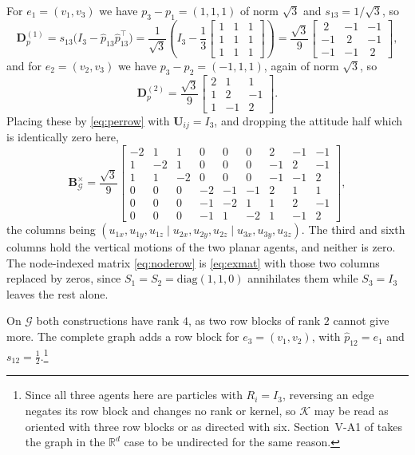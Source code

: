 \documentclass[11pt,a4paper]{article}
\theoremstyle{plain}
\theoremstyle{definition}
\newcommand{\R}{\mathbb{R}}
\newcommand{\Bper}{\mathbf{B}^{\times}}
\newcommand{\Dp}{\mathbf{D}_p}
\begin{document}
For $e_1=(v_1,v_3)$ we have $p_3-p_1=(1,1,1)$ of norm $\sqrt3$ and
$s_{13}=1/\sqrt3$, so
\begin{equation*}
  \Dp^{(1)}=s_{13}\bigl(I_3-\hat p_{13}\hat p_{13}^\top\bigr)
  =\frac{1}{\sqrt3}\left(I_3-\frac13
  \begin{bmatrix}1&1&1\\1&1&1\\1&1&1\end{bmatrix}\right)
  =\frac{\sqrt3}{9}
  \begin{bmatrix}\ 2&-1&-1\\-1&\ 2&-1\\-1&-1&\ 2\end{bmatrix},
\end{equation*}
and for $e_2=(v_2,v_3)$ we have $p_3-p_2=(-1,1,1)$, again of norm $\sqrt3$, so
\begin{equation*}
  \Dp^{(2)}
  =\frac{\sqrt3}{9}
  \begin{bmatrix}2&1&1\\1&2&-1\\1&-1&2\end{bmatrix}.
\end{equation*}
Placing these by \eqref{eq:perrow} with $\mathbf U_{ij}=I_3$, and dropping the
attitude half which is identically zero here,
\begin{equation}\label{eq:exmat}
  \Bper_{\mathcal G}
  =\frac{\sqrt3}{9}
  \left[\begin{array}{rrr|rrr|rrr}
    -2& 1& 1& 0& 0& 0&  2&-1&-1\\
     1&-2& 1& 0& 0& 0& -1& 2&-1\\
     1& 1&-2& 0& 0& 0& -1&-1& 2\\\hline
     0& 0& 0&-2&-1&-1&  2& 1& 1\\
     0& 0& 0&-1&-2& 1&  1& 2&-1\\
     0& 0& 0&-1& 1&-2&  1&-1& 2
  \end{array}\right],
\end{equation}
the columns being $(u_{1x},u_{1y},u_{1z}\mid u_{2x},u_{2y},u_{2z}\mid
u_{3x},u_{3y},u_{3z})$. The third and sixth columns hold the vertical motions
of the two planar agents, and neither is zero. The node-indexed matrix
\eqref{eq:noderow} is \eqref{eq:exmat} with those two columns replaced by
zeros, since $S_1=S_2=\mathrm{diag}(1,1,0)$ annihilates them while $S_3=I_3$
leaves the rest alone.

On $\mathcal G$ both constructions have rank $4$, as two row blocks of rank $2$
cannot give more. The complete graph adds a row block for $e_3=(v_1,v_2)$, with
$\hat p_{12}=e_1$ and $s_{12}=\tfrac12$.\footnote{Since all three agents here
are particles with $R_i=I_3$, reversing an edge negates its row block and
changes no rank or kernel, so $\mathcal K$ may be read as oriented with three
row blocks or as directed with six. Section~V-A1 of \cite{michieletto2021}
takes the graph in the $\R^d$ case to be undirected for the same reason.}
\end{document}
